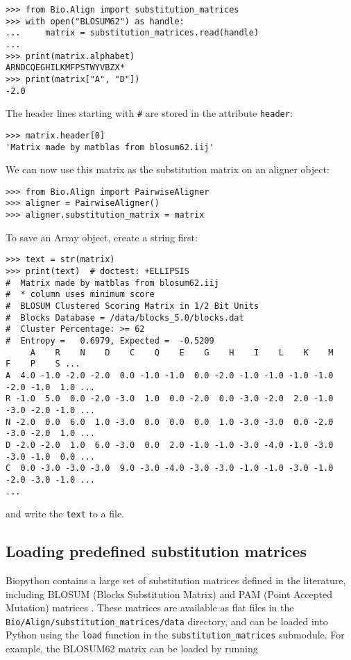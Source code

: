 \begin{verbatim}
>>> from Bio.Align import substitution_matrices
>>> with open("BLOSUM62") as handle:
...     matrix = substitution_matrices.read(handle)
...
>>> print(matrix.alphabet)
ARNDCQEGHILKMFPSTWYVBZX*
>>> print(matrix["A", "D"])
-2.0
\end{verbatim}
The header lines starting with \verb+#+ are stored in the attribute \verb+header+:

\begin{verbatim}
>>> matrix.header[0]
'Matrix made by matblas from blosum62.iij'
\end{verbatim}
We can now use this matrix as the substitution matrix on an aligner object:

\begin{verbatim}
>>> from Bio.Align import PairwiseAligner
>>> aligner = PairwiseAligner()
>>> aligner.substitution_matrix = matrix
\end{verbatim}
To save an Array object, create a string first:

\begin{verbatim}
>>> text = str(matrix)
>>> print(text)  # doctest: +ELLIPSIS
#  Matrix made by matblas from blosum62.iij
#  * column uses minimum score
#  BLOSUM Clustered Scoring Matrix in 1/2 Bit Units
#  Blocks Database = /data/blocks_5.0/blocks.dat
#  Cluster Percentage: >= 62
#  Entropy =   0.6979, Expected =  -0.5209
     A    R    N    D    C    Q    E    G    H    I    L    K    M    F    P    S ...
A  4.0 -1.0 -2.0 -2.0  0.0 -1.0 -1.0  0.0 -2.0 -1.0 -1.0 -1.0 -1.0 -2.0 -1.0  1.0 ...
R -1.0  5.0  0.0 -2.0 -3.0  1.0  0.0 -2.0  0.0 -3.0 -2.0  2.0 -1.0 -3.0 -2.0 -1.0 ...
N -2.0  0.0  6.0  1.0 -3.0  0.0  0.0  0.0  1.0 -3.0 -3.0  0.0 -2.0 -3.0 -2.0  1.0 ...
D -2.0 -2.0  1.0  6.0 -3.0  0.0  2.0 -1.0 -1.0 -3.0 -4.0 -1.0 -3.0 -3.0 -1.0  0.0 ...
C  0.0 -3.0 -3.0 -3.0  9.0 -3.0 -4.0 -3.0 -3.0 -1.0 -1.0 -3.0 -1.0 -2.0 -3.0 -1.0 ...
...
\end{verbatim}
and write the \verb+text+ to a file.

\subsection{Loading predefined substitution matrices}

Biopython contains a large set of substitution matrices defined in the literature, including BLOSUM (Blocks Substitution Matrix) \cite{henikoff1992} and PAM (Point Accepted Mutation) matrices \cite{dayhoff1978}. These matrices are available as flat files in the \verb+Bio/Align/substitution_matrices/data+ directory, and can be loaded into Python using the \verb+load+ function in the \verb+substitution_matrices+ submodule. For example, the BLOSUM62 matrix can be loaded by running

